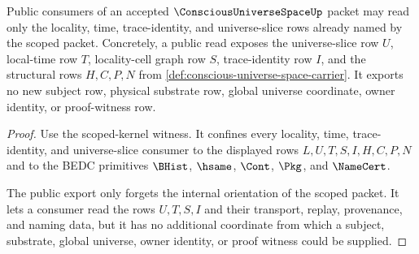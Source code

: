 \begin{theorem}
\label{thm:conscious-universe-space-public-export}
Public consumers of an accepted $\ConsciousUniverseSpaceUp$ packet may read only the locality, time, trace-identity, and universe-slice rows already named by the scoped packet. Concretely, a public read exposes the universe-slice row $U$, local-time row $T$, locality-cell graph row $S$, trace-identity row $I$, and the structural rows $H,C,P,N$ from \autoref{def:conscious-universe-space-carrier}. It exports no new subject row, physical substrate row, global universe coordinate, owner identity, or proof-witness row.
\end{theorem}
\begin{proof}
Use the scoped-kernel witness. It confines every locality, time, trace-identity, and universe-slice consumer to the displayed rows $L,U,T,S,I,H,C,P,N$ and to the BEDC primitives $\BHist$, $\hsame$, $\Cont$, $\Pkg$, and $\NameCert$.

The public export only forgets the internal orientation of the scoped packet. It lets a consumer read the rows $U,T,S,I$ and their transport, replay, provenance, and naming data, but it has no additional coordinate from which a subject, substrate, global universe, owner identity, or proof witness could be supplied.
\end{proof}


